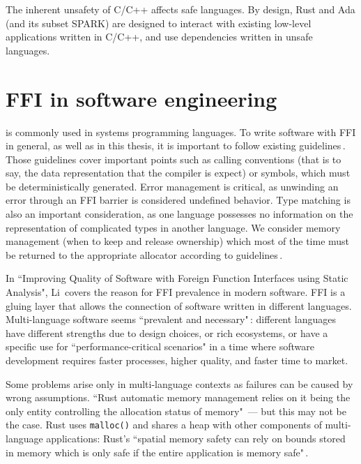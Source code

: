\documentclass[nomenclature, english, bibtex]{kththesis}
\begin{document}
The inherent unsafety of C/C++ affects safe languages. By design, Rust and Ada (and its subset SPARK) are designed to interact with existing low-level applications written in C/C++, and use dependencies written in unsafe languages. 

\section[FFI in software engineering]{FFI in software engineering}

 is commonly used in systems programming languages. 
To write software with FFI in general, as well as in this thesis, it is important to follow existing guidelines\,\cite{gjengset_rust_2021, noauthor_ffi_nodate, noauthor_multi-language_nodate}. 
Those guidelines cover important points such as calling conventions (that is to say, the data representation that the compiler is expect) or symbols, which must be deterministically generated. Error management is critical, as unwinding an error through an FFI barrier is considered undefined behavior. Type matching is also an important consideration, as one language possesses no information on the representation of complicated types in another language. We consider memory management (when to keep and release ownership) which most of the time must be returned to the appropriate allocator according to guidelines\,\cite{gjengset_rust_2021}. 

In ``Improving Quality of Software with Foreign Function Interfaces using Static Analysis", Li\,\cite{li_improving_2014} covers the reason for FFI prevalence in modern software. FFI is a gluing layer that allows the connection of software written in different languages. Multi-language software seems ``prevalent and necessary"\,\cite{li_detecting_2022}: different languages have different strengths due to design choices, or rich ecosystems, or have a specific use for ``performance-critical scenarios" in a time where software development requires faster processes, higher quality, and faster time to market.

Some problems arise only in multi-language contexts as failures can be caused by wrong assumptions. ``Rust automatic memory management relies on it being the only entity controlling the allocation status of memory"\,\cite{mergendahl_cross-language_2022} --- but this may not be the case. Rust uses \texttt{malloc()} and shares a heap with other components of multi-language applications: Rust's ``spatial memory safety can rely on bounds stored in memory which is only safe if the entire application is memory safe"\,\cite{mergendahl_cross-language_2022}.
\end{document}
